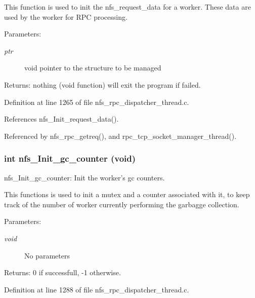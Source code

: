 This function is used to init the nfs\_\-request\_\-data for a worker. These data are used by the worker for RPC processing.

\begin{Desc}
\item[Parameters:]
\begin{description}
\item[{\em ptr}]void pointer to the structure to be managed\end{description}
\end{Desc}
\begin{Desc}
\item[Returns:]nothing (void function) will exit the program if failed. \end{Desc}


Definition at line 1265 of file nfs\_\-rpc\_\-dispatcher\_\-thread.c.

References nfs\_\-Init\_\-request\_\-data().

Referenced by nfs\_\-rpc\_\-getreq(), and rpc\_\-tcp\_\-socket\_\-manager\_\-thread().
\subsubsection{\setlength{\rightskip}{0pt plus 5cm}int nfs\_\-Init\_\-gc\_\-counter (void)}\label{nfs__rpc__dispatcher__thread_8c_a30}


nfs\_\-Init\_\-gc\_\-counter: Init the worker's gc counters.

This functions is used to init a mutex and a counter associated with it, to keep track of the number of worker currently performing the garbagge collection.

\begin{Desc}
\item[Parameters:]
\begin{description}
\item[{\em void}]No parameters\end{description}
\end{Desc}
\begin{Desc}
\item[Returns:]0 if successfull, -1 otherwise. \end{Desc}


Definition at line 1288 of file nfs\_\-rpc\_\-dispatcher\_\-thread.c.

